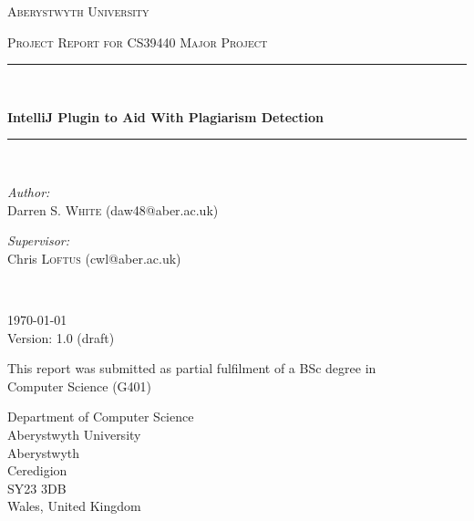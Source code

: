 \begin{titlepage}
  \begin{center}
    \vspace*{.06\textheight}
    {\scshape\LARGE Aberystwyth University\par}\vspace{1.5cm}
    \textsc{\Large Project Report for CS39440 Major Project}\\[0.5cm]

    \rule{.9\linewidth}{.6pt} \\[0.4cm]
    {\huge \bfseries IntelliJ Plugin to Aid With Plagiarism Detection\par}\vspace{0.4cm}
    \rule{.9\linewidth}{.6pt} \\[1.5cm]

    \begin{minipage}[t]{0.4\textwidth}
    \begin{flushleft} \large
    \emph{Author:}\\
    Darren S. \textsc{White} (daw48@aber.ac.uk)
    \end{flushleft}
    \end{minipage}
    \begin{minipage}[t]{0.4\textwidth}
    \begin{flushright} \large
    \emph{Supervisor:} \\
    Chris \textsc{Loftus} (cwl@aber.ac.uk)
    \end{flushright}
    \end{minipage}\\[1cm]

    \vfill

    \large \today\\[0.3cm]
    Version: 1.0 (draft)\\[1cm]

    \vfill

    \large This report was submitted as partial fulfilment of a BSc degree in\\[0.3cm]
    Computer Science (G401)\\[2cm]

    \vfill

    \begin{minipage}[t]{\textwidth}
    \begin{flushleft} \large
    Department of Computer Science\\
    Aberystwyth University\\
    Aberystwyth\\
    Ceredigion\\
    SY23 3DB\\
    Wales, United Kingdom\\
    \end{flushleft}
    \end{minipage}

    \vfill
  \end{center}
\end{titlepage}

